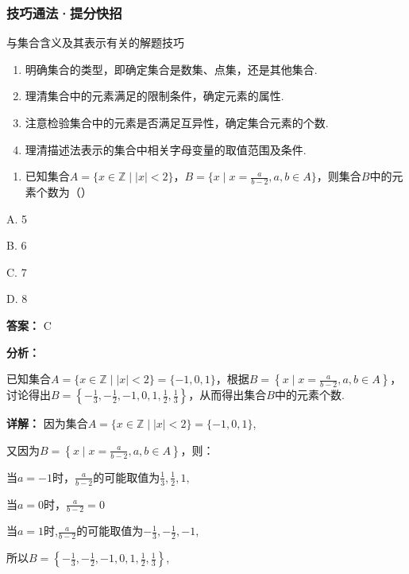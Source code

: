 \documentclass[11pt,a4paper]{ctexart}
\begin{document}
\subsubsection{技巧通法·提分快招}\label{ux6280ux5de7ux901aux6cd5ux63d0ux5206ux5febux62db}

\begin{methodbox}{与集合含义及其表示有关的解题技巧}
  

\begin{enumerate}[label=(\arabic*), leftmargin=*]
    \item 明确集合的类型，即确定集合是数集、点集，还是其他集合.
    \item 理清集合中的元素满足的限制条件，确定元素的属性.
    \item 注意检验集合中的元素是否满足互异性，确定集合元素的个数.
    \item 理清描述法表示的集合中相关字母变量的取值范围及条件.
  \end{enumerate}
\end{methodbox}

\begin{enumerate}[label=\arabic*., leftmargin=*]
\item 已知集合\(A = \{x \in \mathbb{Z} \mid |x| < 2\}\)，\(B = \{x \mid x = \frac{a}{b - 2}, a, b \in A\}\)，则集合\(B\)中的元素个数为（）
\end{enumerate}

A. 5

B. 6

C. 7

D. 8

\textbf{答案：}
C

\textbf{分析：}

已知集合\(A = \{x \in \mathbb{Z} \mid |x| < 2\} = \{-1,0,1\}\)，根据\(B = \left\{x \mid x = \frac{a}{b-2}, a, b \in A\right\}\)，讨论得出\(B = \left\{-\frac{1}{3}, -\frac{1}{2}, -1,0,1, \frac{1}{2}, \frac{1}{3}\right\}\)，从而得出集合\(B\)中的元素个数.

\textbf{详解：}
因为集合\(A = \{x \in \mathbb{Z} \mid |x| < 2\} = \{-1,0,1\}\),

又因为\(B = \left\{x\mid x = \frac{a}{b - 2},a,b\in A\right\}\)，则：

当\(a = -1\)时，\(\frac{a}{b - 2}\)的可能取值为\(\frac{1}{3},\frac{1}{2},1,\)

当\(a = 0\)时，\(\frac{a}{b - 2} = 0\)

当\(a = 1\)时,\(\frac{a}{b - 2}\)的可能取值为\(-\frac{1}{3}, -\frac{1}{2}, -1\),

所以\(B = \left\{-\frac{1}{3}, -\frac{1}{2}, -1, 0, 1, \frac{1}{2}, \frac{1}{3}\right\}\),
\end{document}

